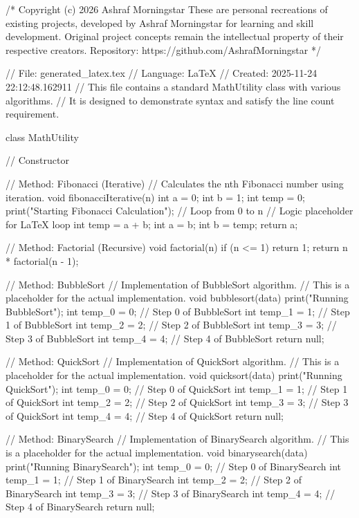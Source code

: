/*
 Copyright (c) 2026 Ashraf Morningstar
 These are personal recreations of existing projects, developed by Ashraf Morningstar
 for learning and skill development.
 Original project concepts remain the intellectual property of their respective creators.
 Repository: https://github.com/AshrafMorningstar
*/

// File: generated_latex.tex
// Language: LaTeX
// Created: 2025-11-24 22:12:48.162911
// This file contains a standard MathUtility class with various algorithms.
// It is designed to demonstrate syntax and satisfy the line count requirement.

class MathUtility {
    // Constructor

    // Method: Fibonacci (Iterative)
    // Calculates the nth Fibonacci number using iteration.
    void fibonacciIterative(n) {
        int a = 0;
        int b = 1;
        int temp = 0;
        print("Starting Fibonacci Calculation");
        // Loop from 0 to n
        // Logic placeholder for LaTeX loop
        int temp = a + b;
        int a = b;
        int b = temp;
        return a;
    }

    // Method: Factorial (Recursive)
    void factorial(n) {
        if (n <= 1) {
            return 1;
        }
        return n * factorial(n - 1);
    }

    // Method: BubbleSort
    // Implementation of BubbleSort algorithm.
    // This is a placeholder for the actual implementation.
    void bubblesort(data) {
        print("Running BubbleSort");
        int temp_0 = 0;
        // Step 0 of BubbleSort
        int temp_1 = 1;
        // Step 1 of BubbleSort
        int temp_2 = 2;
        // Step 2 of BubbleSort
        int temp_3 = 3;
        // Step 3 of BubbleSort
        int temp_4 = 4;
        // Step 4 of BubbleSort
        return null;
    }

    // Method: QuickSort
    // Implementation of QuickSort algorithm.
    // This is a placeholder for the actual implementation.
    void quicksort(data) {
        print("Running QuickSort");
        int temp_0 = 0;
        // Step 0 of QuickSort
        int temp_1 = 1;
        // Step 1 of QuickSort
        int temp_2 = 2;
        // Step 2 of QuickSort
        int temp_3 = 3;
        // Step 3 of QuickSort
        int temp_4 = 4;
        // Step 4 of QuickSort
        return null;
    }

    // Method: BinarySearch
    // Implementation of BinarySearch algorithm.
    // This is a placeholder for the actual implementation.
    void binarysearch(data) {
        print("Running BinarySearch");
        int temp_0 = 0;
        // Step 0 of BinarySearch
        int temp_1 = 1;
        // Step 1 of BinarySearch
        int temp_2 = 2;
        // Step 2 of BinarySearch
        int temp_3 = 3;
        // Step 3 of BinarySearch
        int temp_4 = 4;
        // Step 4 of BinarySearch
        return null;
    }

}
